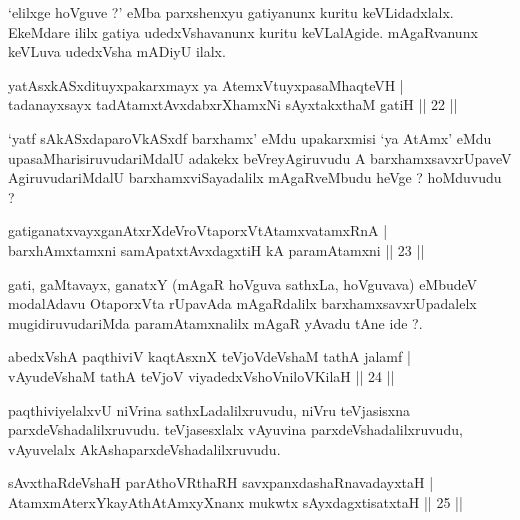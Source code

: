 \begin{artha}
`elilxge hoVguve ?' eMba parxshenxyu gatiyanunx kuritu keVLidadxlalx. EkeMdare ililx gatiya udedxVshavanunx kuritu keVLalAgide. mAgaRvanunx keVLuva udedxVsha mADiyU ilalx.
\end{artha}


\begin{shl}
yatAsxkASxdituyxpakarxmayx ya AtemxVtuyxpasaMhaqteVH |\\
tadanayxsayx tadAtamxtAvxdabxrXhamxNi sAyxtakxthaM gatiH \hfill || 22 || 
\end{shl}

\begin{artha}
`yatf sAkASxdaparoVkASxdf barxhamx' eMdu upakarxmisi `ya AtAmx' eMdu upasaMharisiruvudariMdalU adakekx beVreyAgiruvudu A barxhamxsavxrUpaveV AgiruvudariMdalU barxhamxviSayadalilx mAgaRveMbudu heVge ? hoMduvudu ?
\end{artha}

\begin{shl}
gatiganatxvayxganAtxrXdeVroVtaporxVtAtamxvatamxRnA |\\
barxhAmxtamxni samApatxtAvxdagxtiH kA paramAtamxni \hfill || 23 || 
\end{shl}

\begin{artha}
gati, gaMtavayx, ganatxY (mAgaR hoVguva sathxLa, hoVguvava) eMbudeV modalAdavu OtaporxVta rUpavAda mAgaRdalilx barxhamxsavxrUpadalelx mugidiruvudariMda paramAtamxnalilx mAgaR yAvadu tAne ide ?.
\end{artha}


\begin{shl}
abedxVshA paqthiviV kaqtAsxnX teVjoVdeVshaM tathA jalamf |\\
vAyudeVshaM tathA teVjoV viyadedxVshoV\s niloV\s KilaH \hfill || 24 || 
\end{shl}

\begin{artha}
paqthiviyelalxvU niVrina sathxLadalilxruvudu, niVru teVjasisxna parxdeVshadalilxruvudu. teVjasesxlalx vAyuvina parxdeVshadalilxruvudu, vAyuvelalx AkAshaparxdeVshadalilxruvudu.
\end{artha}

\begin{shl}
sAvxthaRdeVshaH parAthoVR\s thaRH savxpanxdashaRnavadayxtaH |\\
AtamxmAterxYkayAthAtAmxyXnanx mukwtx sAyxdagxtisatxtaH \hfill || 25 || 
\end{shl}

